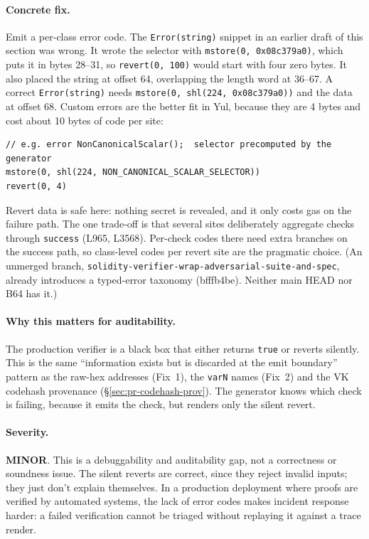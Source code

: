 \paragraph{Concrete fix.}  Emit a per-class error
code. The \texttt{Error(string)} snippet in an earlier draft of
this section was wrong. It wrote the selector with
\texttt{mstore(0, 0x08c379a0)}, which puts it in bytes 28--31, so
\texttt{revert(0, 100)} would start with four zero bytes. It also
placed the string at offset 64, overlapping the length word at
36--67. A correct \texttt{Error(string)} needs
\texttt{mstore(0, shl(224, 0x08c379a0))} and the data at offset 68.
Custom errors are the better fit in Yul, because they are 4 bytes
and cost about 10 bytes of code per site:

\begin{lstlisting}[style=yul]
// e.g. error NonCanonicalScalar();  selector precomputed by the generator
mstore(0, shl(224, NON_CANONICAL_SCALAR_SELECTOR))
revert(0, 4)
\end{lstlisting}

Revert data is safe here: nothing secret is revealed, and it only
costs gas on the failure path. The one trade-off is that several
sites deliberately aggregate checks through \texttt{success} (L965,
L3568). Per-check codes there need extra branches on the success
path, so class-level codes per revert site are the pragmatic
choice. (An unmerged branch,
\texttt{solidity-verifier-wrap-adversarial-suite-and-spec}, already
introduces a typed-error taxonomy (bfffb4be). Neither main HEAD nor
B64 has it.)

\paragraph{Why this matters for auditability.} The production
verifier is a black box that either returns \texttt{true} or
reverts silently. This is the same ``information exists but is
discarded at the emit boundary'' pattern as the raw-hex addresses
(Fix~1), the \texttt{varN} names (Fix~2) and the VK codehash
provenance (\S\ref{sec:pr-codehash-prov}). The generator knows which
check is failing, because it emits the check, but renders only the
silent revert.

\paragraph{Severity.} \textbf{MINOR}. This is a debuggability and
auditability gap, not a correctness or soundness issue. The silent
reverts are correct, since they reject invalid inputs; they just
don't explain themselves. In a production deployment where proofs
are verified by automated systems, the lack of error codes makes
incident response harder: a failed verification cannot be triaged
without replaying it against a trace render.

